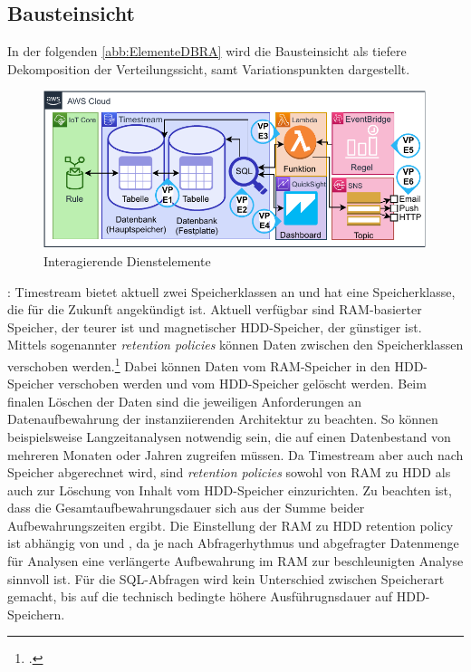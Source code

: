
\subsection{Bausteinsicht}
In der folgenden \autoref{abb:ElementeDBRA} wird die Bausteinsicht als tiefere Dekomposition der Verteilungssicht, samt Variationspunkten dargestellt.
\begin{figure}[H]
\centering
\includegraphics[width=\textwidth]{graphics/DB-RA-Elements.pdf}
\caption{Interagierende Dienstelemente}
\label{abb:ElementeDBRA}
\end{figure}

: Timestream bietet aktuell zwei Speicherklassen an und hat eine Speicherklasse, die für die Zukunft angekündigt ist. Aktuell verfügbar sind \ac{RAM}-basierter Speicher, der teurer ist und magnetischer \ac{HDD}-Speicher, der günstiger ist. Mittels sogenannter \textit{retention policies} können Daten zwischen den Speicherklassen verschoben werden.\footcite[Vgl. auch im Folgenden][]{AmazonWebServicesInc..o.J.bp} Dabei können Daten vom \ac{RAM}-Speicher in den \ac{HDD}-Speicher verschoben werden und vom \ac{HDD}-Speicher gelöscht werden. Beim finalen Löschen der Daten sind die jeweiligen Anforderungen an Datenaufbewahrung der instanziierenden Architektur zu beachten. So können beispielsweise Langzeitanalysen notwendig sein, die auf einen Datenbestand von mehreren Monaten oder Jahren zugreifen müssen. Da Timestream aber auch nach Speicher abgerechnet wird, sind \textit{retention policies} sowohl von \ac{RAM} zu \ac{HDD} als auch zur Löschung von Inhalt vom \ac{HDD}-Speicher einzurichten. Zu beachten ist, dass die Gesamtaufbewahrungsdauer sich aus der Summe beider Aufbewahrungszeiten ergibt. Die Einstellung der \ac{RAM} zu \ac{HDD} retention policy ist abhängig von  und , da je nach Abfragerhythmus und abgefragter Datenmenge für Analysen eine verlängerte Aufbewahrung im \ac{RAM} zur beschleunigten Analyse sinnvoll ist. Für die \ac{SQL}-Abfragen wird kein Unterschied zwischen Speicherart gemacht, bis auf die technisch bedingte höhere Ausführugnsdauer auf \ac{HDD}-Speichern.

